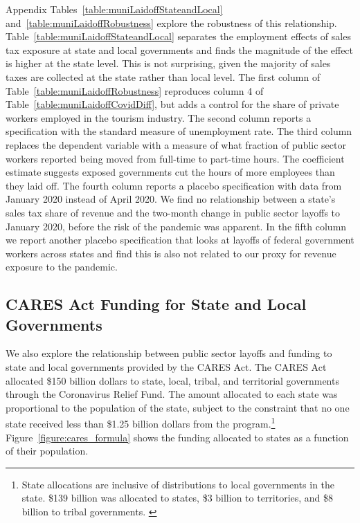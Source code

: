Appendix Tables~\ref{table:muniLaidoffStateandLocal} and~\ref{table:muniLaidoffRobustness} explore the robustness of this relationship. Table~\ref{table:muniLaidoffStateandLocal} separates the employment effects of sales tax exposure at state and local governments and finds the magnitude of the effect is higher at the state level. This is not surprising, given the majority of sales taxes are collected at the state rather than local level. The first column of Table~\ref{table:muniLaidoffRobustness} reproduces column 4 of Table~\ref{table:muniLaidoffCovidDiff}, but adds a control for the share of private workers employed in the tourism industry. The second column reports a specification with the standard measure of unemployment rate. The third column replaces the dependent variable with a measure of what fraction of public sector workers reported being moved from full-time to part-time hours. The coefficient estimate suggests exposed governments cut the hours of more employees than they laid off. The fourth column reports a placebo specification with data from January 2020 instead of April 2020. We find no relationship between a state's sales tax share of revenue and the two-month change in public sector layoffs to January 2020, before the risk of the pandemic was apparent. In the fifth column we report another placebo specification that looks at layoffs of federal government workers across states and find this is also not related to our proxy for revenue exposure to the pandemic.

\subsection{CARES Act Funding for State and Local Governments}
\label{subsec:CARESActFunding}

We also explore the relationship between public sector layoffs and funding to state and local governments provided by the CARES Act. The CARES Act allocated \$150 billion dollars to state, local, tribal, and territorial governments through the Coronavirus Relief Fund. The amount allocated to each state was proportional to the population of the state, subject to the constraint that no one state received less than \$1.25 billion dollars from the program.\footnote{State allocations are inclusive of distributions to local governments in the state. \$139 billion was allocated to states, \$3 billion to territories, and \$8 billion to tribal governments. \citet{CRS_Cares}} Figure~\ref{figure:cares_formula} shows the funding allocated to states as a function of their population.  

